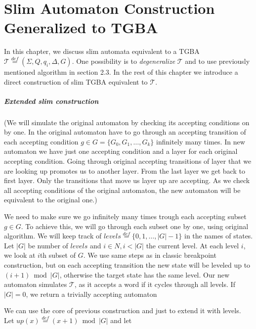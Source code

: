 \documentclass[
	digital
nolof, nolot
]{fithesis3}
\newcommand{\cT}{\mathcal{T}}
\newcommand{\eqdef}{\overset{def}{=}}
\begin{document}
			
			\chapter{Slim Automaton Construction Generalized to TGBA} \label{section:gslim}
			In this chapter, we discuss slim automata equivalent to a TGBA $\cT\eqdef(\Sigma, Q, q_i, \Delta, G)$.
			One possibility is to \emph{degeneralize} $\cT$ and to use previously mentioned algorithm in section 2.3.
			In the rest of this chapter we introduce a direct construction of slim TGBA equivalent to $\cT$.
			\paragraph{Extended slim construction}
			(We will simulate the original automaton by checking its accepting conditions on by one. In the original automaton have to go through an accepting transition of each accepting condition $g \in G=\{G_0, G_1, \ldots, G_k\}$ infinitely many times. In new automaton we have just one accepting condition and a layer for each original accepting condition. Going through original accepting transitions of layer that we are looking up promotes us to another layer. From the last layer we get back to first layer. Only the transitions that move us layer up are accepting. As we check all accepting conditions of the original automaton, the new automaton will be equivalent to the original one.)
			
			We need to make sure we go infinitely many times trough each accepting subset $g \in G$.
			To achieve this, we will go through each subset one by one, using original algorithm. We will keep track of $levels\eqdef\{0,1,\ldots,|G|-1\}$ in the names of states. Let $|G|$ be number of $levels$ and $i \in N, i<|G|$ the current level. At each level $i$, we look at $i$th subset of $G$. We use same steps as in classic breakpoint construction, but on each accepting transition the new state will be leveled up to $(i+1)\bmod|G|$, otherwise the target state has the same level. Our new automaton simulates $\cT$, as it accepts a word if it cycles through all levels. If $|G|=0$, we return a trivially accepting automaton
			
			We can use the core of previous construction and just to extend it with levels. Let
			$up(x)\eqdef(x+1)\bmod|G|$ and let 
			
			
\end{document}
